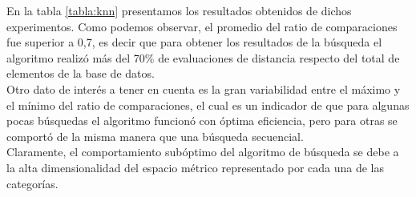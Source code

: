 En la tabla \ref{tabla:knn} presentamos los resultados obtenidos de dichos experimentos. Como podemos observar, el promedio del ratio de comparaciones fue superior a 0,7, es decir que para obtener los resultados de la b\'usqueda el algoritmo realizó m\'as del 70\% de evaluaciones de distancia respecto del total de elementos de la base de datos.\\

Otro dato de inter\'es a tener en cuenta es la gran variabilidad entre el m\'aximo y el m\'inimo del ratio de comparaciones, el cual es un indicador de que para algunas pocas b\'usquedas el algoritmo funcion\'o con \'optima eficiencia, pero para otras se comport\'o de la misma manera que una b\'usqueda secuencial.\\

Claramente, el comportamiento sub\'optimo del algoritmo de b\'usqueda se debe a la alta dimensionalidad del espacio m\'etrico representado por cada una de las categor\'ias.